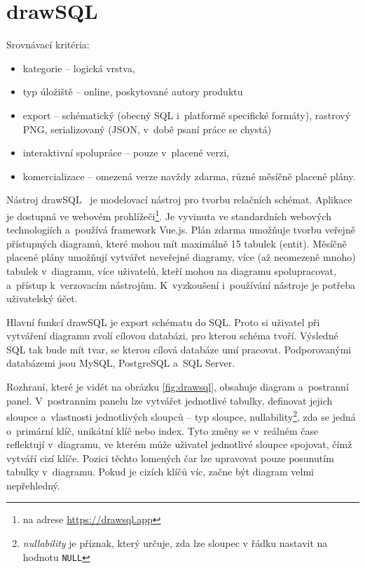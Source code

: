 \section{drawSQL}

Srovnávací kritéria:
\begin{itemize}
  \item kategorie -- logická vrstva,
  \item typ úložiště -- online, poskytované autory produktu
  \item export -- schématický (obecný SQL i~platformě specifické formáty),
  rastrový PNG, serializovaný (JSON, v~době psaní práce se chystá)
  \item interaktivní spolupráce -- pouze v~placené verzi,
  \item komercializace -- omezená verze navždy zdarma, různé měsíčně placené
  plány.
\end{itemize}

Nástroj drawSQL~\cite{drawsql21} je modelovací nástroj pro tvorbu relačních
schémat. Aplikace je dostupná ve webovém prohlížeči\footnote{na adrese
\url{https://drawsql.app}}. Je vyvinuta ve standardních webových technologiích
a~používá framework Vue.js. Plán zdarma umožňuje tvorbu veřejně přístupných
diagramů, které mohou mít maximálně 15 tabulek (entit). Měsíčně placené plány
umožňují vytvářet neveřejné diagramy, více (až neomezeně mnoho) tabulek
v~diagramu, více uživatelů, kteří mohou na diagramu spolupracovat, a~přístup
k~verzovacím nástrojům. K~vyzkoušení i~používání nástroje je potřeba uživatelský
účet.

Hlavní funkcí drawSQL je export schématu do SQL. Proto si uživatel při vytváření
diagramu zvolí cílovou databázi, pro kterou schéma tvoří. Výsledné SQL tak bude
mít tvar, se kterou cílová databáze umí pracovat. Podporovanými databázemi jsou
MySQL, PostgreSQL a~SQL Server.

Rozhraní, které je vidět na obrázku \ref{fig:drawsql}, obsahuje diagram
a~postranní panel. V~postranním panelu lze vytvářet jednotlivé tabulky,
definovat jejich sloupce a~vlastnosti jednotlivých sloupců -- typ sloupce,
nullability\footnote{\emph{nullability} je příznak, který určuje, zda lze sloupec v
řádku nastavit na hodnotu \texttt{NULL}}, zda se jedná o~primární klíč, unikátní klíč
nebo index. Tyto změny se v~reálném čase reflektují v~diagramu, ve kterém může
uživatel jednotlivé sloupce spojovat, čímž vytváří cizí klíče. Pozici těchto
lomených čar lze upravovat pouze posunutím tabulky v~diagramu. Pokud je cizích
klíčů víc, začne být diagram velmi nepřehledný.

